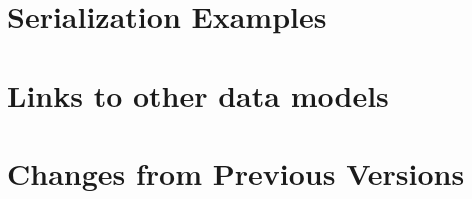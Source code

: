 \documentclass[11pt,a4paper]{ivoa}
\begin{document}
%


%

\begin{appendices}

\section{Serialization Examples}
\label{sec:appendix-serialization-examples}



%

\section{Links to other data models}
\label{sec:dmlinks}


\clearpage

\section{Changes from Previous Versions}

\end{appendices}
\end{document}
